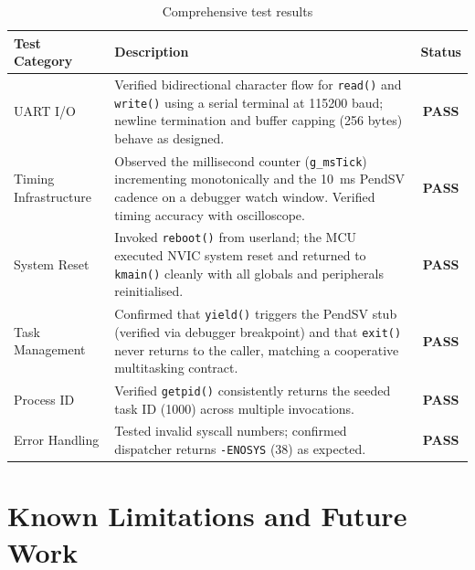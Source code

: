 \documentclass[11pt,a4paper]{article}
\begin{document}
\begin{table}[h]
\centering
\begin{tabularx}{\linewidth}{@{}l X c@{}}
\toprule
\textbf{Test Category} & \textbf{Description} & \textbf{Status} \\
\midrule
UART I/O & Verified bidirectional character flow for \texttt{read()} and \texttt{write()} using a serial terminal at 115200 baud; newline termination and buffer capping (256 bytes) behave as designed. & \textcolor{green!60!black}{\textbf{PASS}} \\[0.3cm]
Timing Infrastructure & Observed the millisecond counter (\texttt{g\_msTick}) incrementing monotonically and the 10~ms PendSV cadence on a debugger watch window. Verified timing accuracy with oscilloscope. & \textcolor{green!60!black}{\textbf{PASS}} \\[0.3cm]
System Reset & Invoked \texttt{reboot()} from userland; the MCU executed NVIC system reset and returned to \texttt{kmain()} cleanly with all globals and peripherals reinitialised. & \textcolor{green!60!black}{\textbf{PASS}} \\[0.3cm]
Task Management & Confirmed that \texttt{yield()} triggers the PendSV stub (verified via debugger breakpoint) and that \texttt{exit()} never returns to the caller, matching a cooperative multitasking contract. & \textcolor{green!60!black}{\textbf{PASS}} \\[0.3cm]
Process ID & Verified \texttt{getpid()} consistently returns the seeded task ID (1000) across multiple invocations. & \textcolor{green!60!black}{\textbf{PASS}} \\[0.3cm]
Error Handling & Tested invalid syscall numbers; confirmed dispatcher returns \texttt{-ENOSYS} (38) as expected. & \textcolor{green!60!black}{\textbf{PASS}} \\
\bottomrule
\end{tabularx}
\caption{Comprehensive test results}
\label{tab:test-results}
\end{table}


\section{Known Limitations and Future Work}
\end{document}

